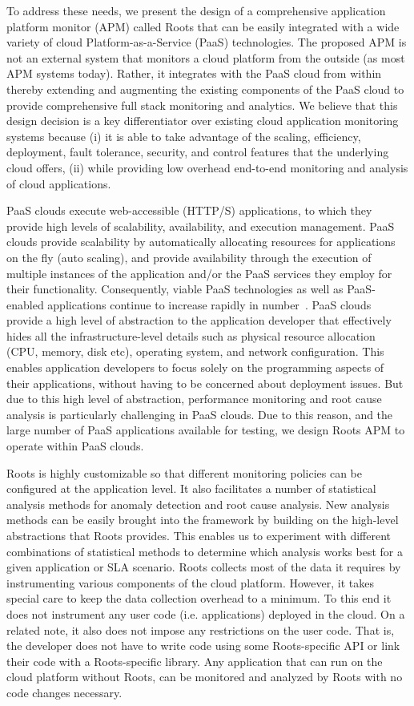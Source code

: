 To address these needs, we present the design of 
a comprehensive application platform 
monitor (APM) called Roots that can be easily integrated with a wide variety of cloud Platform-as-a-Service 
(PaaS) technologies. The proposed
APM is not an external system that monitors a cloud platform from the outside (as most APM systems today). 
Rather, it integrates with
the PaaS cloud from within thereby extending and augmenting the existing components of the PaaS cloud
to provide comprehensive full stack monitoring and analytics. 
We believe that this design decision is a key differentiator over existing cloud 
application monitoring systems because (i) it is
able to take advantage of the scaling, efficiency, deployment, fault tolerance, security, 
and control features that the underlying cloud offers, 
(ii) while providing low overhead end-to-end monitoring and analysis of cloud applications.

PaaS clouds execute web-accessible (HTTP/S) applications, to which they provide 
high levels of scalability, availability, and execution management. 
PaaS clouds provide scalability by automatically allocating resources 
for applications on the fly (auto scaling), and provide availability through
the execution of multiple instances of the application and/or the PaaS
services they employ for their functionality.
Consequently, viable PaaS technologies as well as
PaaS-enabled applications continue to increase rapidly in number~\cite{paas-growth}.
PaaS clouds provide a high level of abstraction to the application developer that effectively hides
all the infra\-structure-level details such as physical resource allocation (CPU, memory, disk etc), operating
system,
and network configuration. This enables application developers to focus solely on the programming
aspects of their applications, without having to be concerned about deployment issues. But
due to this high level of abstraction, performance monitoring and root cause analysis
is particularly challenging in PaaS clouds. Due to this reason, and the large number of 
PaaS applications available for testing, we design Roots APM to operate within PaaS
clouds.

Roots is highly customizable so that different monitoring policies can be
configured at the application level. It also facilitates a number of statistical analysis
methods for anomaly detection and root cause analysis. New analysis methods
can be easily brought into the framework by building on the high-level abstractions
that Roots provides. This enables us to experiment with different combinations of
statistical methods to determine which analysis works best for a given application or
SLA scenario. Roots collects most of the data it requires by instrumenting 
various components of the cloud platform. However, it takes special care to keep the data
collection overhead to a minimum. To this end it does not instrument any user code (i.e. applications)
deployed in the cloud. On a related note, it also does not impose any restrictions on the user code.
That is, the developer does not have to write code using some Roots-specific API or link their
code with a Roots-specific library. Any application that can run on the cloud platform without Roots, can
be monitored and analyzed by Roots with no code changes necessary. 

